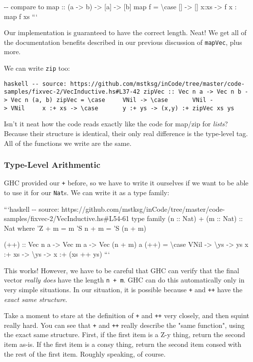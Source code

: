 \documentclass[]{article}
\begin{document}
-\/- compare to map :: (a -\textgreater{} b) -\textgreater{} {[}a{]}
-\textgreater{} {[}b{]} map f = \textbackslash{}case {[}{]} -\textgreater{}
{[}{]} x:xs -\textgreater{} f x : map f xs ```

Our implementation is guaranteed to have the correct length. Neat! We get all of
the documentation benefits described in our previous discussion of
\texttt{mapVec}, plus more.

We can write \texttt{zip} too:

\texttt{haskell\ -\/-\ source:\ https://github.com/mstksg/inCode/tree/master/code-samples/fixvec-2/VecInductive.hs\#L37-42\ zipVec\ ::\ Vec\ n\ a\ -\textgreater{}\ Vec\ n\ b\ -\textgreater{}\ Vec\ n\ (a,\ b)\ zipVec\ =\ \textbackslash{}case\ \ \ \ \ VNil\ -\textgreater{}\ \textbackslash{}case\ \ \ \ \ \ \ VNil\ -\textgreater{}\ VNil\ \ \ \ \ x\ :+\ xs\ -\textgreater{}\ \textbackslash{}case\ \ \ \ \ \ \ y\ :+\ ys\ -\textgreater{}\ (x,y)\ :+\ zipVec\ xs\ ys}

Isn't it neat how the code reads exactly like the code for map/zip for
\emph{lists}? Because their structure is identical, their only real difference
is the type-level tag. All of the functions we write are the same.

\subsubsection{Type-Level Arithmentic}

GHC provided our \texttt{+} before, so we have to write it ourselves if we want
to be able to use it for our \texttt{Nat}s. We can write it as a type family:

```haskell -\/- source:
https://github.com/mstksg/inCode/tree/master/code-samples/fixvec-2/VecInductive.hs\#L54-61
type family (n :: Nat) + (m :: Nat) :: Nat where 'Z + m = m 'S n + m = 'S (n +
m)

(++) :: Vec n a -\textgreater{} Vec m a -\textgreater{} Vec (n + m) a (++) =
\textbackslash{}case VNil -\textgreater{} \textbackslash{}ys -\textgreater{} ys
x :+ xs -\textgreater{} \textbackslash{}ys -\textgreater{} x :+ (xs ++ ys) ```

This works! However, we have to be careful that GHC can verify that the final
vector \emph{really does} have the length \texttt{n\ +\ m}. GHC can do this
automatically only in very simple situations. In our situation, it is possible
because \texttt{+} and \texttt{++} have the \emph{exact same structure}.

Take a moment to stare at the definition of \texttt{+} and \texttt{++} very
closely, and then squint really hard. You can see that \texttt{+} and
\texttt{++} really describe the "same function", using the exact same structure.
First, if the first item is a Z-y thing, return the second item as-is. If the
first item is a consy thing, return the second item consed with the rest of the
first item. Roughly speaking, of course.
\end{document}
